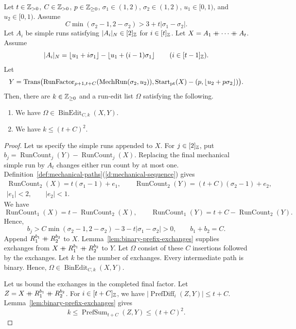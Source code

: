 \begin{lemma}\label{lem:binary-final-completion}
Let $t\in\mathbb Z_{>0}$, $C\in\mathbb Z_{>0}$, $p\in\mathbb Z_{\ge0}$, $\sigma_1\in(1,2)$, $\sigma_2\in(1,2)$, $u_1\in[0,1)$, and $u_2\in[0,1)$.
Assume
\[
 C\min(\sigma_2-1,2-\sigma_2)>3+t|\sigma_1-\sigma_2|.
\]
Let $A_i$ be simple runs satisfying $|A_i|_N\in[2]_{\mathbb Z}$ for $i\in[t]_{\mathbb Z}$.
Let $X=A_1\mathbin{+\mkern-10mu+} \cdots\mathbin{+\mkern-10mu+} A_t$.
Assume
\[
 |A_i|_N=\left\lfloor u_1+i\sigma_1\right\rfloor-\left\lfloor u_1+(i-1)\sigma_1\right\rfloor
 \qquad(i\in[t-1]_{\mathbb Z}).
\]
Let
\[
 Y=\operatorname{Trans}\bigl(\operatorname{RunFactor}_{p+1,t+C}(\operatorname{MechRun}(\sigma_2,u_2)),
  \operatorname{Start}_{\mathrm{pt}}(X)-(p,\left\lfloor u_2+p\sigma_2\right\rfloor)\bigr).
\]
Then, there are $k\in\mathbb Z_{\ge0}$ and a run-edit list $\Omega$ satisfying the following.
\begin{enumerate}
\item\label{c:binary-final-target} We have $\Omega\in\operatorname{BinEdit}_{C,k}(X,Y)$.
\item\label{c:binary-final-exchanges} We have $k\le(t+C)^2$.
\end{enumerate}
\end{lemma}
\begin{proof}
 Let us specify the simple runs appended to $X$.
For $j\in[2]_{\mathbb Z}$, put $b_j=\operatorname{RunCount}_j(Y)-\operatorname{RunCount}_j(X)$.
Replacing the final mechanical simple run by $A_t$ changes either run count by at most one.
Definition~\ref{def:mechanical-paths}(\ref{d:mechanical-sequence}) gives
\[
\begin{gathered}
 \operatorname{RunCount}_2(X)=t(\sigma_1-1)+e_1,\qquad
 \operatorname{RunCount}_2(Y)=(t+C)(\sigma_2-1)+e_2,\\
 |e_1|<2,\qquad |e_2|<1.
\end{gathered}
\]
We have
\[
 \operatorname{RunCount}_1(X)=t-\operatorname{RunCount}_2(X),\qquad
 \operatorname{RunCount}_1(Y)=t+C-\operatorname{RunCount}_2(Y).
\] Hence,
\[
 b_j>C\min(\sigma_2-1,2-\sigma_2)-3-t|\sigma_1-\sigma_2|>0,
 \qquad b_1+b_2=C.
\]
Append $R_1^{b_1}\mathbin{+\mkern-10mu+} R_2^{b_2}$ to $X$.
Lemma~\ref{lem:binary-prefix-exchanges} supplies exchanges from $X\mathbin{+\mkern-10mu+} R_1^{b_1}\mathbin{+\mkern-10mu+} R_2^{b_2}$ to $Y$.
Let $\Omega$ consist of these $C$ insertions followed by the exchanges. Let $k$ be the number of exchanges.
Every intermediate path is binary. Hence, $\Omega\in\operatorname{BinEdit}_{C,k}(X,Y)$.

Let us bound the exchanges in the completed final factor.
 Let $Z=X\mathbin{+\mkern-10mu+} R_1^{b_1}\mathbin{+\mkern-10mu+} R_2^{b_2}$.
For $i\in[t+C]_{\mathbb Z}$, we have $|\operatorname{PrefDiff}_i(Z,Y)|\le t+C$.
Lemma~\ref{lem:binary-prefix-exchanges} gives
\[
 k\le\operatorname{PrefSum}_{t+C}(Z,Y)\le(t+C)^2.
\]
\end{proof}

